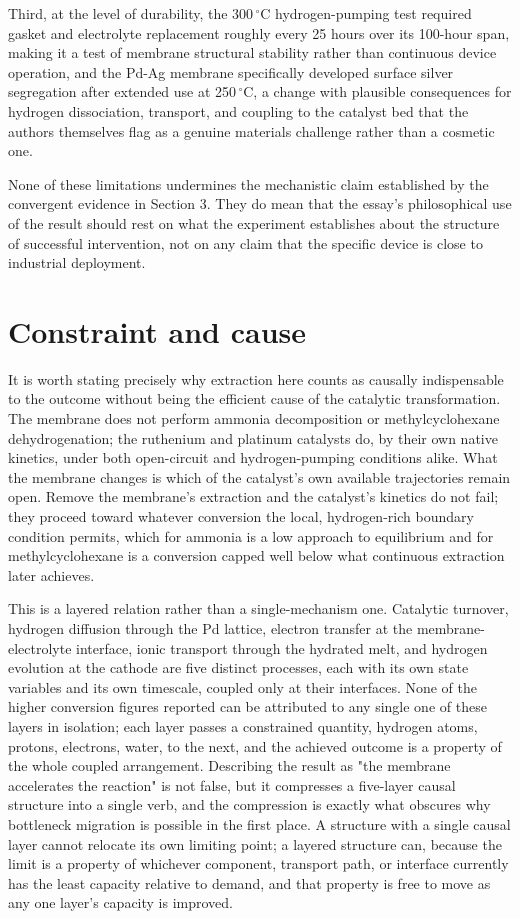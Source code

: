 \documentclass[11pt]{article}
\begin{document}
Third, at the level of durability, the 300\,$^\circ$C hydrogen-pumping test required gasket and electrolyte replacement roughly every 25 hours over its 100-hour span, making it a test of membrane structural stability rather than continuous device operation, and the Pd-Ag membrane specifically developed surface silver segregation after extended use at 250\,$^\circ$C, a change with plausible consequences for hydrogen dissociation, transport, and coupling to the catalyst bed that the authors themselves flag as a genuine materials challenge rather than a cosmetic one.

None of these limitations undermines the mechanistic claim established by the convergent evidence in Section 3. They do mean that the essay's philosophical use of the result should rest on what the experiment establishes about the structure of successful intervention, not on any claim that the specific device is close to industrial deployment.

\section{Constraint and cause}

It is worth stating precisely why extraction here counts as causally indispensable to the outcome without being the efficient cause of the catalytic transformation. The membrane does not perform ammonia decomposition or methylcyclohexane dehydrogenation; the ruthenium and platinum catalysts do, by their own native kinetics, under both open-circuit and hydrogen-pumping conditions alike. What the membrane changes is which of the catalyst's own available trajectories remain open. Remove the membrane's extraction and the catalyst's kinetics do not fail; they proceed toward whatever conversion the local, hydrogen-rich boundary condition permits, which for ammonia is a low approach to equilibrium and for methylcyclohexane is a conversion capped well below what continuous extraction later achieves.

This is a layered relation rather than a single-mechanism one. Catalytic turnover, hydrogen diffusion through the Pd lattice, electron transfer at the membrane-electrolyte interface, ionic transport through the hydrated melt, and hydrogen evolution at the cathode are five distinct processes, each with its own state variables and its own timescale, coupled only at their interfaces. None of the higher conversion figures reported can be attributed to any single one of these layers in isolation; each layer passes a constrained quantity, hydrogen atoms, protons, electrons, water, to the next, and the achieved outcome is a property of the whole coupled arrangement. Describing the result as "the membrane accelerates the reaction" is not false, but it compresses a five-layer causal structure into a single verb, and the compression is exactly what obscures why bottleneck migration is possible in the first place. A structure with a single causal layer cannot relocate its own limiting point; a layered structure can, because the limit is a property of whichever component, transport path, or interface currently has the least capacity relative to demand, and that property is free to move as any one layer's capacity is improved.
\end{document}

